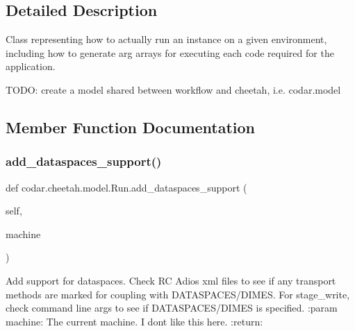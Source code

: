 \subsection{Detailed Description}
\begin{DoxyVerb}Class representing how to actually run an instance on a given environment,
including how to generate arg arrays for executing each code required for
the application.

TODO: create a model shared between workflow and cheetah, i.e. codar.model
\end{DoxyVerb}
 

\subsection{Member Function Documentation}
\mbox{\label{classcodar_1_1cheetah_1_1model_1_1_run_a5fc7b380524cfda5c77104b61e4441fd}} 
\subsubsection{\texorpdfstring{add\+\_\+dataspaces\+\_\+support()}{add\_dataspaces\_support()}}
{\footnotesize\ttfamily def codar.\+cheetah.\+model.\+Run.\+add\+\_\+dataspaces\+\_\+support (\begin{DoxyParamCaption}\item[{}]{self,  }\item[{}]{machine }\end{DoxyParamCaption})}

\begin{DoxyVerb}Add support for dataspaces.
Check RC Adios xml files to see if any transport methods are marked
for coupling with DATASPACES/DIMES.
For stage_write, check command line args to see if DATASPACES/DIMES
is specified.
:param machine: The current machine. I dont like this here.
:return:
\end{DoxyVerb}
 \mbox{\label{classcodar_1_1cheetah_1_1model_1_1_run_a30df1617b81f2cfcde9f57d443ca25cb}} 
